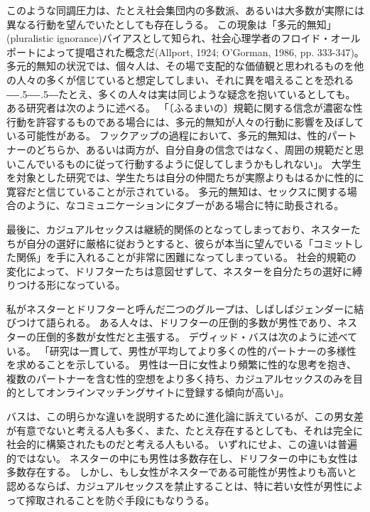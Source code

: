 \documentclass[paper=a4,book,openany]{jlreq}
\def\DDASH{―\kern-.5\zw―\kern-.5\zw―}
\begin{document}
このような同調圧力は、たとえ社会集団内の多数派、あるいは大多数が実際には異なる行動を望んでいたとしても存在しうる。
この現象は「多元的無知」(pluralistic ignorance)バイアスとして知られ、社会心理学者のフロイド・オールポートによって提唱された概念だ(Allport, 1924; O'Gorman, 1986, pp. 333-347)。
\nocite{allport24:_social_psyc,ogorman86:_disc_plur_ignor}多元的無知の状況では、個々人は、その場で支配的な価値観と思われるものを他の人々の多くが信じていると想定してしまい、それに異を唱えることを恐れる{\DDASH}たとえ、多くの人々は実は同じような疑念を抱いているとしても。
ある研究者は次のように述べる。
「〔ふるまいの〕規範に関する信念が濃密な性行動を許容するものである場合には、多元的無知が人々の行動に影響を及ぼしている可能性がある。
フックアップの過程において、多元的無知は、性的パートナーのどちらか、あるいは両方が、自分自身の信念ではなく、周囲の規範だと思いこんでいるものに従って行動するように促してしまうかもしれない」\citep[p. 130]{griggs03:_plur_ignor_hook_up}。
大学生を対象とした研究では、学生たちは自分の仲間たちが実際よりもはるかに性的に寛容だと信じていることが示されている\citep{chia06:_how_media_cont,reiber10:_hook_up}。
多元的無知は、セックスに関する場合のように、なコミュニケーションにタブーがある場合に特に助長される。

最後に、カジュアルセックスは継続的関係のとなってしまっており、ネスターたちが自分の選好に厳格に従おうとすると、彼らが本当に望んでいる「コミットした関係」を手に入れることが非常に困難になってしまっている。
社会的規範の変化によって、ドリフターたちは意図せずして、ネスターを自分たちの選好に縛りつける形になっている。

私がネスターとドリフターと呼んだ二つのグループは、しばしばジェンダーに結びつけて語られる。
ある人々は、ドリフターの圧倒的多数が男性であり、ネスターの圧倒的多数が女性だと主張する\citep[cf.][]{regnerus12:_cont_matin_mark}。
デヴィッド・バスは次のように述べている。
「研究は一貫して、男性が平均してより多くの性的パートナーの多様性を求めることを示している。
男性は一日に女性より頻繁に性的な思考を抱き、複数のパートナーを含む性的空想をより多く持ち、カジュアルセックスのみを目的としてオンラインマッチングサイトに登録する傾向が高い」\citep{buss16:_what_do_you}。

バスは、この明らかな違いを説明するために進化論に訴えているが、この男女差が有意でないと考える人も多く、また、たとえ存在するとしても、それは完全に社会的に構築されたものだと考える人もいる。
いずれにせよ、この違いは普遍的ではない。
ネスターの中にも男性は多数存在し、ドリフターの中にも女性は多数存在する。
しかし、もし女性がネスターである可能性が男性よりも高いと認めるならば、カジュアルセックスを禁止することは、特に若い女性が男性によって搾取されることを防ぐ手段にもなりうる。
\end{document}
